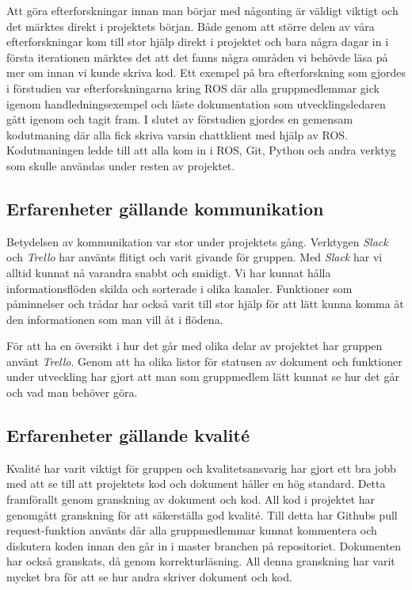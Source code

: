 Att göra efterforskningar innan man börjar med någonting är väldigt viktigt och det märktes direkt i projektets början. Både genom att större delen av våra efterforskningar kom till stor hjälp direkt i projektet och bara några dagar in i första iterationen märktes det att det fanns några områden vi behövde läsa på mer om innan vi kunde skriva kod. Ett exempel på bra efterforskning som gjordes i förstudien var efterforskningarna kring ROS där alla gruppmedlemmar gick igenom handledningsexempel och läste dokumentation som utvecklingsledaren gått igenom och tagit fram. I slutet av förstudien gjordes en gemensam kodutmaning där alla fick skriva varsin chattklient med hjälp av ROS. Kodutmaningen ledde till att alla kom in i ROS, Git, Python och andra verktyg som skulle användas under resten av projektet.


\subsection{Erfarenheter gällande kommunikation}

Betydelsen av kommunikation var stor under projektets gång. Verktygen \textit{Slack} och \textit{Trello} har använts flitigt och varit givande för gruppen. Med \textit{Slack} har vi alltid kunnat nå varandra snabbt och smidigt. Vi har kunnat hålla informationsflöden skilda och sorterade i olika kanaler. Funktioner som påminnelser och trådar har också varit till stor hjälp för att lätt kunna komma åt den informationen som man vill åt i flödena.

För att ha en översikt i hur det går med olika delar av projektet har gruppen använt \textit{Trello}. Genom att ha olika listor för statusen av dokument och funktioner under utveckling har gjort att man som gruppmedlem lätt kunnat se hur det går och vad man behöver göra.


\subsection{Erfarenheter gällande kvalité}

Kvalité har varit viktigt för gruppen och kvalitetsansvarig har gjort ett bra jobb med att se till att projektets kod och dokument håller en hög standard. Detta framförallt genom granskning av dokument och kod. All kod i projektet har genomgått granskning för att säkerställa god kvalité. Till detta har Githubs pull request-funktion använts där alla gruppmedlemmar kunnat kommentera och diskutera koden innan den går in i master branchen på repositoriet. Dokumenten har också granskats, då genom korrekturläsning. All denna granskning har varit mycket bra för att se hur andra skriver dokument och kod.


